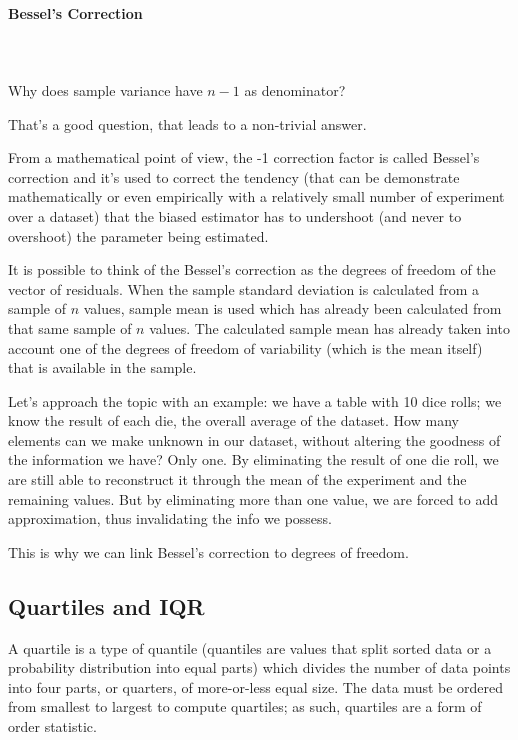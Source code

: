 \documentclass{article}
\begin{document}
\paragraph{Bessel's Correction}\mbox{} \\ 
\mbox{} \\

Why does sample variance have $n-1$ as denominator?

That’s a good question, that leads to a non-trivial answer. 

From a mathematical point of view, the -1 correction factor is called Bessel’s correction and it’s used to correct the tendency (that can be demonstrate mathematically or even empirically with a relatively small number of experiment over a dataset) that the biased estimator has to undershoot (and never to overshoot) the parameter being estimated.  

It is possible to think of the Bessel's correction as the degrees of freedom of the vector of residuals. When the sample standard deviation is calculated from a sample of $n$ values, sample mean is used which has already been calculated from that same sample of $n$ values. The calculated sample mean has already taken into account one of the degrees of freedom of variability (which is the mean itself) that is available in the sample.

Let's approach the topic with an example: we have a table with 10 dice rolls; we know the result of each die, the overall average of the dataset.
How many elements can we make unknown in our dataset, without altering the goodness of the information we have?
Only one. By eliminating the result of one die roll, we are still able to reconstruct it through the mean of the experiment and the remaining values.
But by eliminating more than one value, we are forced to add approximation, thus invalidating the info we possess.

This is why we can link Bessel's correction to degrees of freedom. 

\subsection{Quartiles and IQR}
A quartile is a type of quantile (quantiles are values that split sorted data or a probability distribution into equal parts) which divides the number of data points into four parts, or quarters, of more-or-less equal size. The data must be ordered from smallest to largest to compute quartiles; as such, quartiles are a form of order statistic. 
\end{document}
